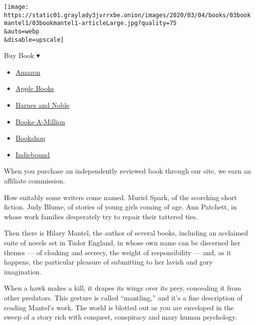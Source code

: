 \texttt{[image: https://static01.graylady3jvrrxbe.onion/images/2020/03/04/books/03bookmantel1/03bookmantel1-articleLarge.jpg?quality=75\\\&auto=webp\\\&disable=upscale]}

Buy Book ▾

\begin{itemize}
\tightlist
\item
  \href{https://www.amazon.com/gp/search?index=books\&tag=NYTBSREV-20\&field-keywords=The+Mirror+and+the+Light+Hilary+Mantel}{Amazon}
\item
  \href{https://du-gae-books-dot-nyt-du-prd.appspot.com/buy?title=The+Mirror+and+the+Light\&author=Hilary+Mantel}{Apple
  Books}
\item
  \href{https://www.anrdoezrs.net/click-7990613-11819508?url=https\%3A\%2F\%2Fwww.barnesandnoble.com\%2Fw\%2F\%3Fean\%3D9780805096606}{Barnes
  and Noble}
\item
  \href{https://www.anrdoezrs.net/click-7990613-35140?url=https\%3A\%2F\%2Fwww.booksamillion.com\%2Fp\%2FThe\%2BMirror\%2Band\%2Bthe\%2BLight\%2FHilary\%2BMantel\%2F9780805096606}{Books-A-Million}
\item
  \href{https://bookshop.org/a/3546/9780805096606}{Bookshop}
\item
  \href{https://www.indiebound.org/book/9780805096606?aff=NYT}{Indiebound}
\end{itemize}

When you purchase an independently reviewed book through our site, we
earn an affiliate commission.

How suitably some writers come named. Muriel Spark, of the scorching
short fiction. Judy Blume, of stories of young girls coming of age. Ann
Patchett, in whose work families desperately try to repair their
tattered ties.

Then there is Hilary Mantel, the author of several books, including an
acclaimed suite of novels set in Tudor England, in whose own name can be
discerned her themes --- of cloaking and secrecy, the weight of
responsibility --- and, as it happens, the particular pleasure of
submitting to her lavish and gory imagination.

When a hawk makes a kill, it drapes its wings over its prey, concealing
it from other predators. This gesture is called ``mantling,'' and it's a
fine description of reading Mantel's work. The world is blotted out as
you are enveloped in the sweep of a story rich with conquest, conspiracy
and mazy human psychology.

